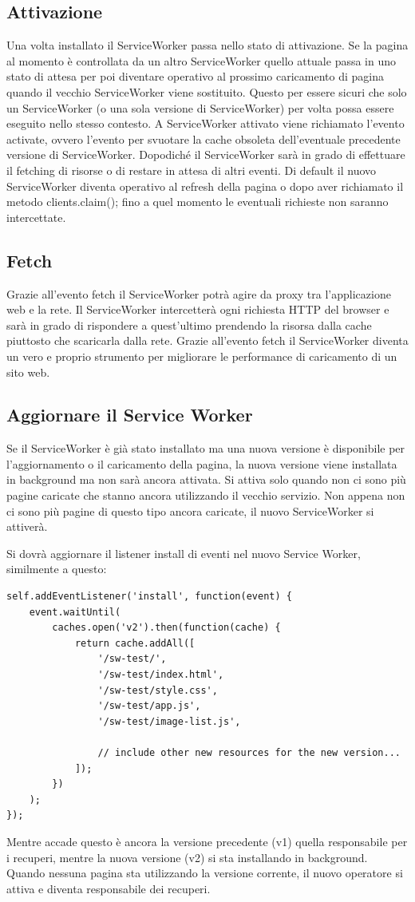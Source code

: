 \documentclass[11pt ,a4paper , twoside , openright ]{article}
\begin{document}
\subsection{Attivazione}
Una volta installato il ServiceWorker passa nello stato di attivazione. Se la pagina al momento è controllata da un altro ServiceWorker quello attuale passa in uno stato di attesa per poi diventare operativo al prossimo caricamento di pagina quando il vecchio ServiceWorker viene sostituito.
Questo per essere sicuri che solo un ServiceWorker (o una sola versione di ServiceWorker) per volta possa essere eseguito nello stesso contesto.
A ServiceWorker attivato viene richiamato l’evento activate, ovvero l'evento per svuotare la cache obsoleta dell’eventuale precedente versione di ServiceWorker. Dopodiché il ServiceWorker sarà in grado di effettuare il fetching di risorse o di restare in attesa di altri eventi.
Di default il nuovo ServiceWorker diventa operativo al refresh della pagina o dopo aver richiamato il metodo clients.claim(); fino a quel momento le eventuali richieste non saranno intercettate. 

\subsection{Fetch}
Grazie all’evento fetch il ServiceWorker potrà agire da proxy tra l’applicazione web e la rete.
Il ServiceWorker intercetterà ogni richiesta HTTP del browser e sarà in grado di rispondere a quest’ultimo prendendo la risorsa dalla cache piuttosto che scaricarla dalla rete.
Grazie all’evento fetch il ServiceWorker diventa un vero e proprio strumento per migliorare le performance di caricamento di un sito web.

\subsection{Aggiornare il Service Worker}
Se il ServiceWorker è già stato installato ma una nuova versione è disponibile per l'aggiornamento o il caricamento della pagina, la nuova versione viene installata in background ma non sarà ancora attivata. Si attiva solo quando non ci sono più pagine caricate che stanno ancora utilizzando il vecchio servizio. Non appena non ci sono più pagine di questo tipo ancora caricate, il nuovo ServiceWorker si attiverà.

Si dovrà aggiornare il listener install di eventi nel nuovo Service Worker, similmente a questo:
\begin{lstlisting}
self.addEventListener('install', function(event) {
	event.waitUntil(
		caches.open('v2').then(function(cache) {
			return cache.addAll([
				'/sw-test/',
				'/sw-test/index.html',
				'/sw-test/style.css',
				'/sw-test/app.js',
				'/sw-test/image-list.js',
								
				// include other new resources for the new version...
			]);
		})
	);
});
\end{lstlisting}
Mentre accade questo è ancora la versione precedente (v1) quella responsabile per i recuperi, mentre la nuova versione (v2) si sta installando in background.
Quando nessuna pagina sta utilizzando la versione corrente, il nuovo operatore si attiva e diventa responsabile dei recuperi.
\end{document}
